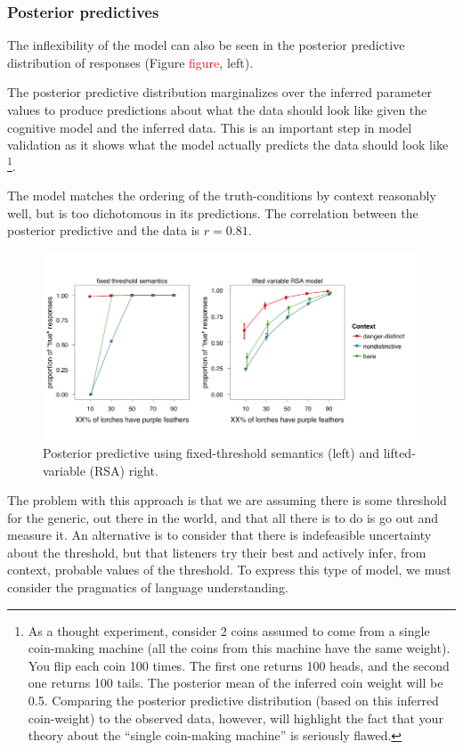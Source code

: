 \documentclass[10pt,letterpaper]{article}
\newcommand{\red}[1]{\textcolor{Red}{#1}}
\begin{document}
\subsubsection{Posterior predictives}

The inflexibility of the model can also be seen in the posterior predictive distribution of responses (Figure \red{figure}, left). 

The posterior predictive distribution marginalizes over the inferred parameter values to produce predictions about what the data should look like given the cognitive model and the inferred data. This is an important step in model validation as it shows what the model actually predicts the data should look like \footnote{As a thought experiment, consider 2 coins assumed to come from a single coin-making machine (all the coins from this machine have the same weight). You flip each coin 100 times. The first one returns 100 heads, and the second one returns 100 tails. The posterior mean of the inferred coin weight will be 0.5. Comparing the posterior predictive distribution (based on this inferred coin-weight) to the observed data, however, will highlight the fact that your theory about the ``single coin-making machine'' is seriously flawed.}.

The model matches the ordering of the truth-conditions by context reasonably well, but is too dichotomous in its predictions. The correlation between the posterior predictive and the data is $r = 0.81$. 

\begin{figure}
\centering
    \includegraphics[width=\columnwidth]{fig3_2pps}
    \caption{Posterior predictive using fixed-threshold semantics (left) and lifted-variable (RSA) right.}
  \label{fig:bda1posteriorpred}
\end{figure}

The problem with this approach is that we are assuming there is some threshold for the generic, out there in the world, and that all there is to do is go out and measure it. An alternative is to consider that there is indefeasible uncertainty about the threshold, but that listeners try their best and actively infer, from context, probable values of the threshold. To express this type of model, we must consider the pragmatics of language understanding. 
\end{document}
